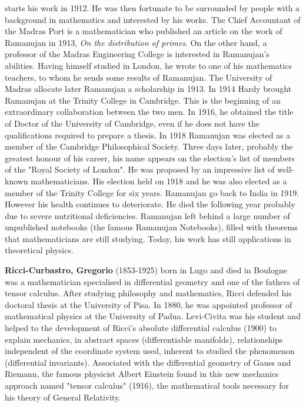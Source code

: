 starts his work in 1912. He was then fortunate to be surrounded by people with a background in mathematics and interested by his works. The Chief Accountant of the Madras Port is a mathematician who published an article on the work of Ramanujan in 1913, \textit{On the distribution of primes}. On the other hand, a professor of the Madras Engineering College is interested in Ramanujan's abilities. Having himself studied in London, he wrote to one of his mathematics teachers, to whom he sends some results of Ramanujan. The University of Madras allocate later Ramanujan a scholarship in 1913. In 1914 Hardy brought Ramanujan at the Trinity College in Cambridge. This is the beginning of an extraordinary collaboration between the two men. In 1916, he obtained the title of Doctor of the University of Cambridge, even if he does not have the qualifications required to prepare a thesis. In 1918 Ramanujan was elected as a member of the Cambridge Philosophical Society. Three days later, probably the greatest honour of his career, his name appears on the election's list of members of the "Royal Society of London". He was proposed by an impressive list of well-known mathematicians. His election held on 1918 and he was also elected as a member of the Trinity College for six years. Ramanujan go back to India in 1919. However his health continues to deteriorate. He died the following year probably due to severe nutritional deficiencies. Ramanujan left behind a large number of unpublished notebooks (the famous Ramanujan Notebooks), filled with theorems that mathematicians are still studying. Today, his work has still applications in theoretical physics.

\textbf{Ricci-Curbastro, Gregorio} (1853-1925) born in Lugo and died in Boulogne was a mathematician specialised in differential geometry and one of the fathers of tensor calculus. After studying philosophy and mathematics, Ricci defended his doctoral thesis at the University of Pisa. In 1880, he was appointed professor of mathematical physics at the University of Padua. Levi-Civita was his student and helped to the development of Ricci's absolute differential calculus (1900) to explain mechanics, in abstract spaces (differentiable manifolds), relationships independent of the coordinate system used, inherent to studied the phenomenon (differential invariants). Associated with the differential geometry of Gauss and Riemann, the famous physicist Albert Einstein found in this new mechanics approach named "tensor calculus" (1916), the mathematical tools necessary for his theory of General Relativity.

